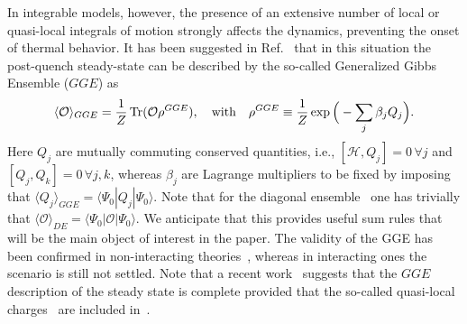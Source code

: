 \documentclass[11pt]{iopart}
\begin{document}
In integrable models, however, the presence of an extensive number of local or 
quasi-local integrals of motion strongly affects the dynamics, preventing the 
onset of thermal behavior. It has been suggested in Ref.~\cite{rigol-2007,
rigol-2008} that in this situation the post-quench steady-state can be described 
by the so-called Generalized Gibbs Ensemble ($GGE$) as 
%
\begin{equation}
\label{gge}
\langle{\mathcal O}\rangle_{GGE}=\frac{1}{Z}\mathop{\mathrm{Tr}}\nolimits({\mathcal O}\rho^{GGE}), 
\quad\textrm{with}\quad\rho^{GGE}\equiv\frac{1}{Z}\exp\Big(-\sum_j\beta_jQ_j\Big). 
\end{equation}
%
Here $Q_j$ are mutually commuting conserved quantities, i.e., $[{\mathcal H},Q_j]=0\,
\forall j$ and $[Q_j,Q_k]=0\,\forall j,k$, whereas $\beta_j$ are Lagrange multipliers 
to be fixed by imposing that  $\langle Q_j\rangle_{GGE}=\langle\Psi_0|Q_j|\Psi_0\rangle$. 
Note that for the diagonal ensemble~  one has trivially that $\langle
{\mathcal O}\rangle_{DE}=\langle\Psi_0|{\mathcal O}|\Psi_0\rangle$. We anticipate that 
this provides  useful sum rules that will be the main object of interest in the paper. 
The validity of the GGE has been confirmed in non-interacting theories~\cite{calabrese-2011,
calabrese-2012,fagotti-2013,kcc14,kcc14a}, whereas in interacting ones the scenario is 
still not settled. Note that a recent work~\cite{ilievski-2015a} suggests that the $GGE$ 
description of the steady state  is complete provided that the so-called quasi-local 
charges~\cite{prosen-2014,pereira-2014,ilievski-2015} are included in~. 
\end{document}
